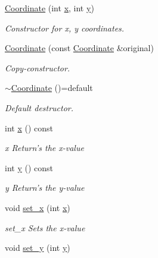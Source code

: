 \begin{DoxyCompactItemize}
\item 
\hyperlink{class_course_1_1_coordinate_af56be76acaf9917f2d1f35cf4ccfbc93}{Coordinate} (int \hyperlink{class_course_1_1_coordinate_a9f680313ef06841f93bd2529dec3ca6b}{x}, int \hyperlink{class_course_1_1_coordinate_aa5bbd123925fc7af30d61b4f11a249d1}{y})
\begin{DoxyCompactList}\small\item\em Constructor for x, y coordinates. \end{DoxyCompactList}\item 
\hyperlink{class_course_1_1_coordinate_a18c82259eeef1cb5b3cd6e90d74ba400}{Coordinate} (const \hyperlink{class_course_1_1_coordinate}{Coordinate} \&original)
\begin{DoxyCompactList}\small\item\em Copy-\/constructor. \end{DoxyCompactList}\item 
\hyperlink{class_course_1_1_coordinate_a3215c67e9fd4af40dd7682f45103777c}{$\sim$\-Coordinate} ()=default
\begin{DoxyCompactList}\small\item\em Default destructor. \end{DoxyCompactList}\item 
int \hyperlink{class_course_1_1_coordinate_a9f680313ef06841f93bd2529dec3ca6b}{x} () const 
\begin{DoxyCompactList}\small\item\em x Return's the x-\/value \end{DoxyCompactList}\item 
int \hyperlink{class_course_1_1_coordinate_aa5bbd123925fc7af30d61b4f11a249d1}{y} () const 
\begin{DoxyCompactList}\small\item\em y Return's the y-\/value \end{DoxyCompactList}\item 
void \hyperlink{class_course_1_1_coordinate_a077dc894b96ff793ede666ca3b4c6dc2}{set\-\_\-x} (int \hyperlink{class_course_1_1_coordinate_a9f680313ef06841f93bd2529dec3ca6b}{x})
\begin{DoxyCompactList}\small\item\em set\-\_\-x Sets the x-\/value \end{DoxyCompactList}\item 
void \hyperlink{class_course_1_1_coordinate_a0308c942bb50d59a216877be0be2599b}{set\-\_\-y} (int \hyperlink{class_course_1_1_coordinate_aa5bbd123925fc7af30d61b4f11a249d1}{y})

\end{DoxyCompactItemize}
